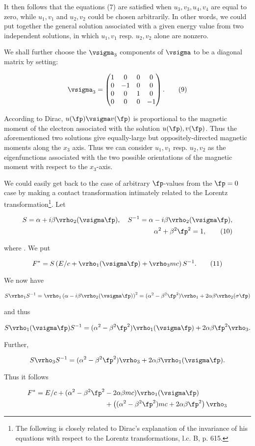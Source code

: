 \documentclass{article}
\newcommand{\nequ}[2]{
\begin{align*}
#1
\tag{#2}
\end{align*}
}
\newcommand{\uequ}[1]{
\begin{align*}
#1
\end{align*}
}
\begin{document}
It then follows that the equations (7) are satisfied when $u_3, v_3, u_4, v_4$ are equal to zero, while $u_1,v_1$ and $u_2,v_2$ could be chosen arbitrarily. In other words, we could put together the general solution associated with a given energy value from two independent solutions, in which $u_1,v_1$ resp. $u_2,v_2$ alone are nonzero.

We shall further choose the $\vsigma_3$ components of $\vsigma$ to be a diagonal matrix  by setting:
\nequ{
\vsigma_3 = \left(\begin{matrix}
 1  & 0  & 0 & 0\\
 0  &-1  & 0 & 0\\
 0  & 0  & 1 & 0\\
 0  & 0  & 0 &-1
\end{matrix}\right).
}{9}

According to Dirac, $u(\fp)\vsigma v(\fp)$ is proportional to the magnetic moment of the electron associated with the solution $u(\fp), v(\fp)$. Thus the aforementioned two solutions give equally-large but oppositely-directed magnetic moments along the $x_3$ axis. Thus we can consider $u_1,v_1$ resp. $u_2,v_2$ as the eigenfunctions associated with the two possible orientations of the magnetic moment with respect to the $x_3$-axis.

We could easily get back to the case of arbitrary $\fp$-values from the $\fp=0$ case by making a contact transformation intimately related to the Lorentz transformation\footnote{The following is closely related to Dirac's explanation of the invariance of his equations with respect to the Lorentz transformations, l.c. B, p. 615.}. Let
\nequ{
S      = \alpha + i\beta\vrho_2 (\vsigma \fp), \quad 
S^{-1} = \alpha - i\beta\vrho_2 (\vsigma \fp),\\
\alpha^2 + \beta^2 \fp^2 = 1,
}{10}
where . We put
\nequ{
F^* = S\left(E/c + \vrho_1(\vsigma \fp) + \vrho_3 mc\right)S^{-1}.
}{11}
We now have
\uequ{
S\vrho_1 S^{-1} = \vrho_1 \left(\alpha - i\beta \vrho_2 (\vsigma \fp)\right)^2
 = (\alpha^2 - \beta^2 \fp^2)\vrho_1 + 2\alpha \beta \vrho_2 (\sigma \fp)
}
and thus
\uequ{
S\vrho_1 (\vsigma \fp) S^{-1} =
 (\alpha^2 - \beta^2 \fp^2)\vrho_1(\vsigma \fp) + 2\alpha \beta \fp^2 \vrho_3.
}
Further,
\uequ{
S\vrho_3 S^{-1} =
 (\alpha^2 - \beta^2 \fp^2)\vrho_3 + 2\alpha \beta \vrho_1 (\vsigma\fp).
}
Thus it follows
\uequ{
F^* = E/c + (\alpha^2 - \beta^2\fp^2 &- 2\alpha\beta mc)\vrho_1 (\vsigma\fp)\\
   &+ \left((\alpha^2 - \beta^2\fp^2)mc + 2\alpha\beta\fp^2\right)\vrho_3
}
\end{document}
